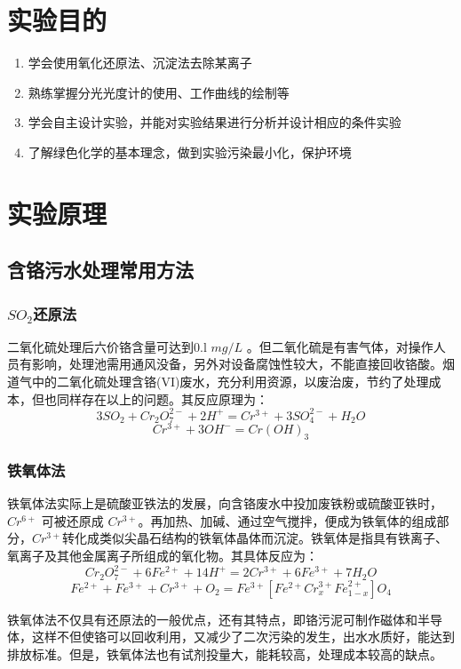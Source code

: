 \documentclass[UTF8,a4paper,11pt,twocolumn]{ctexart}
\begin{document}
\section{实验目的}
\begin{enumerate}
\item 学会使用氧化还原法、沉淀法去除某离子
\item 熟练掌握分光光度计的使用、工作曲线的绘制等
\item 学会自主设计实验，并能对实验结果进行分析并设计相应的条件实验
\item 了解绿色化学的基本理念，做到实验污染最小化，保护环境
\end{enumerate}

\section{实验原理}
\subsection{含铬污水处理常用方法}
\subsubsection{$SO_2$还原法}
二氧化硫处理后六价铬含量可达到0.l $mg/L$ 。但二氧化硫是有害气体，对操作人员有影响，处理池需用通风没备，另外对设备腐蚀性较大，不能直接回收铬酸。烟道气中的二氧化硫处理含铬(VI)废水，充分利用资源，以废治废，节约了处理成本，但也同样存在以上的问题。其反应原理为： 
{\small $$3SO_2 + Cr_2O^{2-}_7 + 2H^+ = Cr^{3+} + 3SO^{2-}_4 + H_2O $$}
{\small $$Cr^{3+} + 3OH^- = Cr(OH)_3$$}

\subsubsection{铁氧体法}
铁氧体法实际上是硫酸亚铁法的发展，向含铬废水中投加废铁粉或硫酸亚铁时，$Cr^{6+}$ 可被还原成 $Cr^{3+}$。再加热、加碱、通过空气搅拌，便成为铁氧体的组成部分，$Cr^{3+}$转化成类似尖晶石结构的铁氧体晶体而沉淀。铁氧体是指具有铁离子、氧离子及其他金属离子所组成的氧化物。其具体反应为： 
{\small $$Cr_2O_7^{2-} + 6Fe^{2+} + 14H^+ = 2Cr^{3+} + 6Fe^{3+} + 7H_2O$$}
{\footnotesize $$Fe^{2+} + Fe^{3+} + Cr^{3+} + O_2 = Fe^{3+}[Fe^{2+} Cr^{3+}_x Fe^{2+}_{1-x}]O_4$$}

铁氧体法不仅具有还原法的一般优点，还有其特点，即铬污泥可制作磁体和半导体，这样不但使铬可以回收利用，又减少了二次污染的发生，出水水质好，能达到排放标准。但是，铁氧体法也有试剂投量大，能耗较高，处理成本较高的缺点。 
\end{document}
